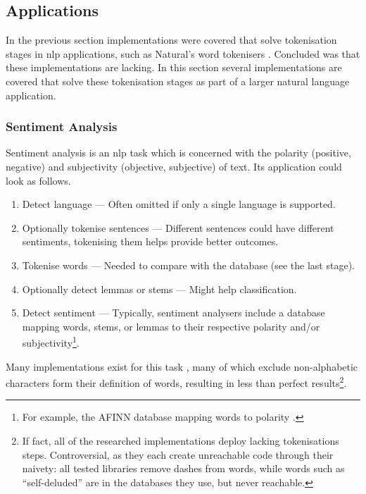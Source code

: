 \subsection{Applications}\label{applications}

In the previous section implementations were covered that solve
tokenisation stages in \gls{nlp} applications, such as Natural's word
tokenisers \autocite{NaturalNode/natural-source-code}. Concluded was
that these implementations are lacking. In this section several
implementations are covered that solve these tokenisation stages as part
of a larger natural language application.

\subsubsection{Sentiment Analysis}\label{sentiment-analysis}

Sentiment analysis is an \gls{nlp} task which is concerned with the
polarity (positive, negative) and subjectivity (objective, subjective)
of text. Its application could look as follows.

\begin{enumerate}
\def\labelenumi{\arabic{enumi}.}
\itemsep1pt\parskip0pt
\item
  Detect language --- Often omitted if only a single language is
  supported.
\item
  Optionally tokenise sentences --- Different sentences could have
  different sentiments, tokenising them helps provide better outcomes.
\item
  Tokenise words --- Needed to compare with the database (see the last
  stage).
\item
  Optionally detect lemmas or stems --- Might help classification.
\item
  Detect sentiment --- Typically, sentiment analysers include a database
  mapping words, stems, or lemmas to their respective polarity and\slash or
  subjectivity\footnote{For example, the AFINN database mapping words to
    polarity \autocite{nielsen-finn-arup-afinn}.}.
\end{enumerate}

Many implementations exist for this task \autocites[e.g.,][]
{thinkroth/sentimental-source-code}{mileszim/sediment-source-code}
{thisandagain/sentiment-source-code}, many of which exclude non-alphabetic
characters form their definition of words, resulting in less than perfect
results\footnote{If fact, all of
  the researched implementations deploy lacking tokenisations steps.
  Controversial, as they each create unreachable code through their
  naivety: all tested libraries remove dashes from words, while words
  such as ``self-deluded'' are in the databases they use, but never
  reachable.}.

